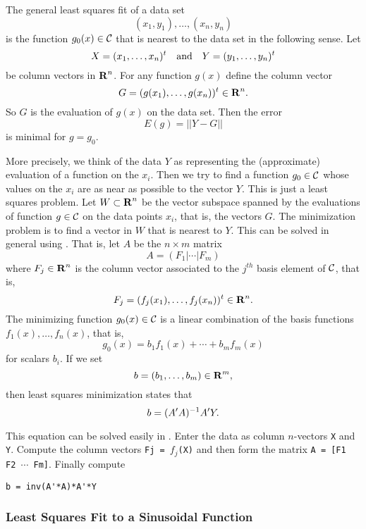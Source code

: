The general least squares fit of a data set
\[
(x_1,y_1),\ldots, (x_n,y_n)
\]
is the function $g_0(x)\in{\cal C}$ that is nearest to the data set in the
following sense.  Let
\[
X = (x_1,\ldots,x_n)^t \quad\mbox{and}\quad Y = (y_1,\ldots,y_n)^t
\]
be column vectors in $\mbox{$\bf{R}$}^n$.  For any function $g(x)$ define the column vector
\[
G = (g(x_1),\ldots,g(x_n))^t\in\mbox{$\bf{R}$}^n.
\]
So $G$ is the evaluation of $g(x)$ on the data set.  Then the error
\[
E(g) = ||Y-G||
\]
is minimal for $g=g_0$.

More precisely, we think of the data $Y$ as representing the (approximate)
evaluation of a function on the $x_i$.  Then we try to find a function
$g_0\in{\cal C}$ whose values on the $x_i$ are as near as possible to
the vector $Y$.  This is just a least squares problem.  Let $W\subset\mbox{$\bf{R}$}^n$ be
the vector subspace spanned by the evaluations of function $g\in{\cal C}$ on
the data points $x_i$, that is, the vectors $G$.  The minimization problem
is to find a vector in $W$ that is nearest to $Y$.  This can be solved in
general using .  That is, let $A$ be the $n\times m$
matrix
\[
A = (F_1|\cdots|F_m)
\]
where $F_j\in\mbox{$\bf{R}$}^n$ is the column vector associated to the $j^{th}$ basis
element of ${\cal C}$, that is,
\[
F_j = (f_j(x_1),\ldots,f_j(x_n))^t\in\mbox{$\bf{R}$}^n.
\]
The minimizing function $g_0(x)\in{\cal C}$ is a linear combination of the
basis functions $f_1(x),\ldots,f_n(x)$, that is,
\[
g_0(x) = b_1f_1(x) + \cdots + b_mf_m(x)
\]
for scalars $b_i$.  If we set
\[
b = (b_1,\ldots,b_m)\in\mbox{$\bf{R}$}^m,
\]
then least squares minimization states that
\begin{equation}  \label{E:LSFG}
b = (A'A)^{-1} A'Y.
\end{equation}

This equation can be solved easily in \Matlabp.  Enter the data as column
$n$-vectors {\tt X} and {\tt Y}.  Compute the column vectors
{\tt Fj = $f_j$(X)} and then form the matrix {\tt A = [F1 F2 $\cdots$ Fm]}.
Finally compute
\begin{verbatim}
b = inv(A'*A)*A'*Y
\end{verbatim}


\subsubsection*{Least Squares Fit to a Sinusoidal Function}


